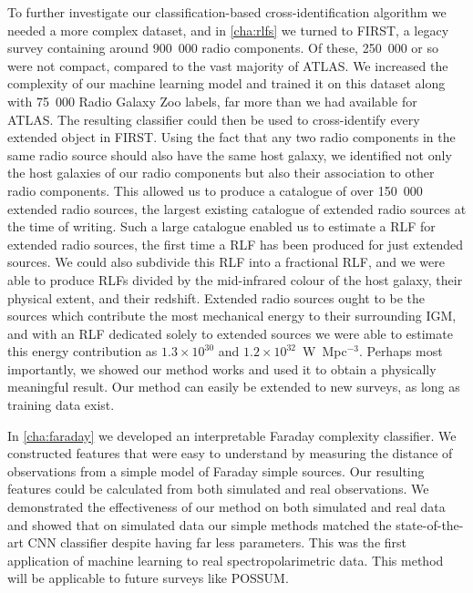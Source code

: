 To further investigate our classification-based cross-identification algorithm we \linebreak needed a more complex dataset, and in \autoref{cha:rlfs} we turned to FIRST, a legacy survey containing around 900~000 radio components. Of these, 250~000 or so were not compact, compared to the vast majority of ATLAS. We increased the complexity of our machine learning model and trained it on this dataset along with 75~000 Radio Galaxy Zoo labels, far more than we had available for ATLAS. The resulting classifier could then be used to cross-identify every extended object in FIRST. Using the fact that any two radio components in the same radio source should also have the same host galaxy, we identified not only the host galaxies of our radio components but also their association to other radio components. This allowed us to produce a catalogue of over 150~000 extended radio sources, the largest existing catalogue of extended radio sources at the time of writing. Such a large catalogue enabled us to estimate a RLF for extended radio sources, the first time a RLF has been produced for just extended sources. We could also subdivide this RLF into a fractional RLF, and we were able to produce RLFs divided by the mid-infrared colour of the host galaxy, their physical extent, and their redshift. Extended radio sources ought to be the sources which contribute the most mechanical energy to their surrounding IGM, and with an RLF dedicated solely to extended sources we were able to estimate this energy contribution as $1.3 \times 10^{30}$ and $1.2 \times 10^{32}$~W~Mpc$^{-3}$. Perhaps most importantly, we showed our method works and used it to obtain a physically meaningful result. Our method can easily be extended to new surveys, as long as training data exist.

In \autoref{cha:faraday} we developed an interpretable Faraday complexity classifier. We constructed features that were easy to understand by measuring the distance of observations from a simple model of Faraday simple sources. Our resulting features could be calculated from both simulated and real observations. We demonstrated the effectiveness of our method on both simulated and real data and showed that on simulated data our simple methods matched the state-of-the-art CNN classifier despite having far less parameters. This was the first application of machine learning to real spectropolarimetric data. This method will be applicable to future surveys like POSSUM.

    
